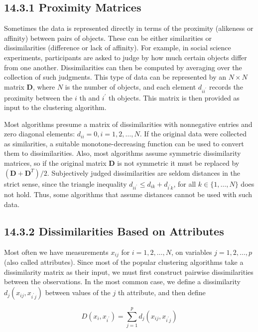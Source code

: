\documentclass[10pt]{article}
\begin{document}
\subsection*{14.3.1 Proximity Matrices}
Sometimes the data is represented directly in terms of the proximity (alikeness or affinity) between pairs of objects. These can be either similarities or dissimilarities (difference or lack of affinity). For example, in social science experiments, participants are asked to judge by how much certain objects differ from one another. Dissimilarities can then be computed by averaging over the collection of such judgments. This type of data can be represented by an $N \times N$ matrix $\mathbf{D}$, where $N$ is the number of objects, and each element $d_{i i^{\prime}}$ records the proximity between the $i$ th and $i^{\prime}$ th objects. This matrix is then provided as input to the clustering algorithm.

Most algorithms presume a matrix of dissimilarities with nonnegative entries and zero diagonal elements: $d_{i i}=0, i=1,2, \ldots, N$. If the original data were collected as similarities, a suitable monotone-decreasing function can be used to convert them to dissimilarities. Also, most algorithms assume symmetric dissimilarity matrices, so if the original matrix $\mathbf{D}$ is not symmetric it must be replaced by $\left(\mathbf{D}+\mathbf{D}^{T}\right) / 2$. Subjectively judged dissimilarities are seldom distances in the strict sense, since the triangle inequality $d_{i i^{\prime}} \leq d_{i k}+d_{i^{\prime} k}$, for all $k \in\{1, \ldots, N\}$ does not hold. Thus, some algorithms that assume distances cannot be used with such data.

\subsection*{14.3.2 Dissimilarities Based on Attributes}
Most often we have measurements $x_{i j}$ for $i=1,2, \ldots, N$, on variables $j=1,2, \ldots, p$ (also called attributes). Since most of the popular clustering algorithms take a dissimilarity matrix as their input, we must first construct pairwise dissimilarities between the observations. In the most common case, we define a dissimilarity $d_{j}\left(x_{i j}, x_{i^{\prime} j}\right)$ between values of the $j$ th attribute, and then define


\begin{equation*}
D\left(x_{i}, x_{i^{\prime}}\right)=\sum_{j=1}^{p} d_{j}\left(x_{i j}, x_{i^{\prime} j}\right) \tag{14.20}
\end{equation*}
\end{document}
